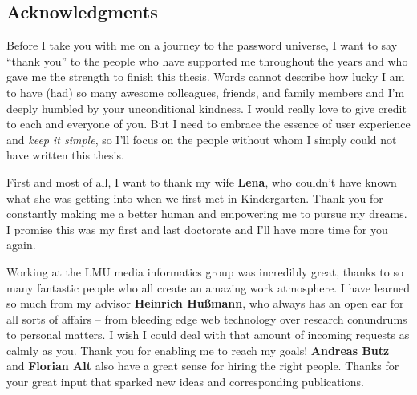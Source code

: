 \subsection*{Acknowledgments}
Before I take you with me on a journey to the password universe, I want to say ``thank you'' to the people who have supported me throughout the years and who gave me the strength to finish this thesis. Words cannot describe how lucky I am to have (had) so many awesome colleagues, friends, and family members and I’m deeply humbled by your unconditional kindness. I would really love to give credit to each and everyone of you. But I need to embrace the essence of user experience and \textit{keep it simple}, so I’ll focus on the people without whom I simply could not have written this thesis. 

First and most of all, I want to thank my wife \textbf{Lena}, who couldn’t have known what she was getting into when we first met in Kindergarten. Thank you for constantly making me a better human and empowering me to pursue my dreams. I promise this was my first and last doctorate and I’ll have more time for you again.  

Working at the LMU media informatics group was incredibly great, thanks to so many fantastic people who all create an amazing work atmosphere. I have learned so much from my advisor \textbf{Heinrich Hußmann}, who always has an open ear for all sorts of affairs -- from bleeding edge web technology over research conundrums to personal matters. I wish I could deal with that amount of incoming requests as calmly as you. Thank you for enabling me to reach my goals! \textbf{Andreas Butz} and \textbf{Florian Alt} also have a great sense for hiring the right people. Thanks for your great input that sparked new ideas and corresponding publications. 

